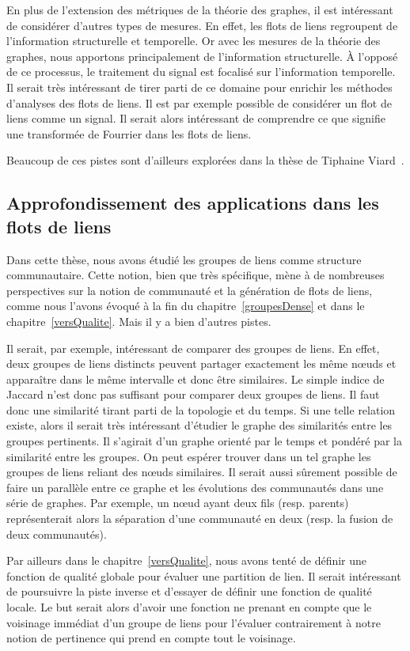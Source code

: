 En plus de l'extension des métriques de la théorie  des graphes, il est intéressant de considérer d'autres types de mesures.
En effet, les flots de liens regroupent de l'information structurelle et temporelle.
Or avec les mesures de la théorie des graphes, nous apportons principalement de l'information structurelle.
\`A l'opposé de ce processus, le traitement du signal est focalisé sur l'information temporelle.
Il serait très intéressant de tirer parti de ce domaine pour enrichir les méthodes d'analyses des flots de liens.
Il est par exemple possible de considérer un flot de liens comme un signal.
Il serait alors intéressant de comprendre ce que signifie une transformée de Fourrier dans les flots de liens.

Beaucoup de ces pistes sont d'ailleurs explorées dans la thèse de Tiphaine Viard~\cite{viard2016flots}.

\subsection{Approfondissement des applications dans les flots de liens}
Dans cette thèse, nous avons étudié les groupes de liens comme structure communautaire.
Cette notion, bien que très spécifique, mène à de nombreuses perspectives sur la notion de communauté et la génération de flots de liens, comme nous l'avons évoqué à la fin du chapitre~\ref{groupesDense} et dans le chapitre~\ref{versQualite}.
Mais il y a bien d'autres pistes.

Il serait, par exemple, intéressant de comparer des groupes de liens.
En effet, deux groupes de liens distincts peuvent partager exactement les même n\oe{}uds et apparaître dans le même intervalle et donc être similaires.
Le simple indice de Jaccard n'est donc pas suffisant pour comparer deux groupes de liens.
Il faut donc une similarité tirant parti de la topologie et du temps.
Si une telle relation existe, alors il serait très intéressant d'étudier le graphe des similarités entre les groupes pertinents.
Il s'agirait d'un graphe orienté par le temps et pondéré par la similarité entre les groupes.
On peut espérer trouver dans un tel graphe les groupes de liens reliant des n\oe{}uds similaires.
Il serait aussi sûrement possible de faire un parallèle entre ce graphe et les évolutions des communautés dans une série de graphes.
Par exemple, un n\oe{}ud ayant deux fils (resp. parents) représenterait alors la séparation d'une communauté en deux (resp. la fusion de deux communautés).

Par ailleurs dans le chapitre~\ref{versQualite}, nous avons tenté de définir une fonction de qualité globale pour évaluer une partition de lien.
Il serait intéressant de poursuivre la piste inverse et d'essayer de définir une fonction de qualité locale.
Le but serait alors d'avoir une fonction ne prenant en compte que le voisinage immédiat d'un groupe de liens pour l'évaluer contrairement à notre notion de pertinence qui prend en compte tout le voisinage.

